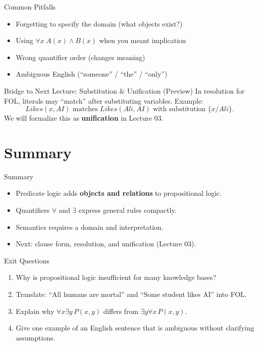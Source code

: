 \documentclass[aspectratio=169]{beamer}
\begin{document}
\begin{frame}{Common Pitfalls}
  \begin{itemize}[<+->]
    \item Forgetting to specify the domain (what objects exist?)
    \item Using $\forall x\; A(x) \land B(x)$ when you meant implication
    \item Wrong quantifier order (changes meaning)
    \item Ambiguous English (``someone'' / ``the'' / ``only'')
  \end{itemize}
\end{frame}

\begin{frame}{Bridge to Next Lecture: Substitution \& Unification (Preview)}
  In resolution for FOL, literals may ``match'' after substituting variables.
  \vspace{0.4em}
  Example:
  \[
    Likes(x, AI) \text{ matches } Likes(Ali, AI) \text{ with substitution } \{x/Ali\}.
  \]
  We will formalize this as \textbf{unification} in Lecture 03.
\end{frame}

\section{Summary}
\label{sec:summary}

\begin{frame}{Summary}
  \begin{itemize}
    \item Predicate logic adds \textbf{objects and relations} to propositional logic.
    \item Quantifiers $\forall$ and $\exists$ express general rules compactly.
    \item Semantics requires a domain and interpretation.
    \item Next: clause form, resolution, and unification (Lecture 03).
  \end{itemize}
  \slidesources{\AIMLUnitIISources}
\end{frame}

\begin{frame}{Exit Questions}
  \begin{enumerate}
    \item Why is propositional logic insufficient for many knowledge bases?
    \item Translate: ``All humans are mortal'' and ``Some student likes AI'' into FOL.
    \item Explain why $\forall x \exists y\, P(x,y)$ differs from $\exists y \forall x\, P(x,y)$.
    \item Give one example of an English sentence that is ambiguous without clarifying assumptions.
  \end{enumerate}
\end{frame}
\end{document}
